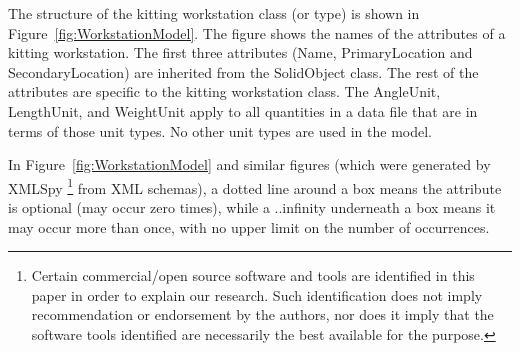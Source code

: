 The structure of the kitting workstation class (or type) is shown in
Figure~\ref{fig:WorkstationModel}. The figure shows the names of the
attributes of a kitting workstation. The first three attributes (Name,
PrimaryLocation and SecondaryLocation) are inherited from the SolidObject
class. The rest of the attributes are specific to the kitting workstation
class. The AngleUnit, LengthUnit, and WeightUnit apply to all quantities in
a data file that are in terms of those unit types. No other unit types are
used in the model.

In Figure~\ref{fig:WorkstationModel} and similar figures (which were
generated by XMLSpy 
\footnote{Certain commercial/open source software and tools are identified in this paper in order to explain our research. Such identification does not imply
recommendation or endorsement by the authors, nor does it imply that the software tools identified are necessarily the best available for the purpose.}
 from XML schemas), a dotted line around a box
means the attribute is optional (may occur zero times), while a \sf
..infinity \rm underneath a box means it may occur more than once, with no
upper limit on the number of occurrences.

\begin{flushleft}
\end{flushleft}

